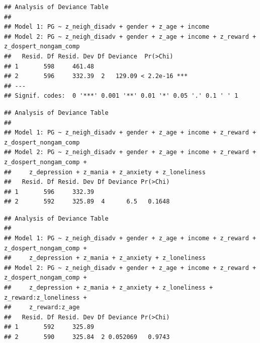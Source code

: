 \documentclass[
]{article}
\newenvironment{Shaded}{\begin{snugshade}}{\end{snugshade}}
\newcommand{\NormalTok}[1]{#1}
\newcommand{\SpecialCharTok}[1]{\textcolor[rgb]{0.81,0.36,0.00}{\textbf{#1}}}
\begin{document}
\begin{verbatim}
## Analysis of Deviance Table
## 
## Model 1: PG ~ z_neigh_disadv + gender + z_age + income
## Model 2: PG ~ z_neigh_disadv + gender + z_age + income + z_reward + z_dospert_nongam_comp
##   Resid. Df Resid. Dev Df Deviance  Pr(>Chi)    
## 1       598     461.48                          
## 2       596     332.39  2   129.09 < 2.2e-16 ***
## ---
## Signif. codes:  0 '***' 0.001 '**' 0.01 '*' 0.05 '.' 0.1 ' ' 1
\end{verbatim}

\begin{Shaded}
\end{Shaded}

\begin{verbatim}
## Analysis of Deviance Table
## 
## Model 1: PG ~ z_neigh_disadv + gender + z_age + income + z_reward + z_dospert_nongam_comp
## Model 2: PG ~ z_neigh_disadv + gender + z_age + income + z_reward + z_dospert_nongam_comp + 
##     z_depression + z_mania + z_anxiety + z_loneliness
##   Resid. Df Resid. Dev Df Deviance Pr(>Chi)
## 1       596     332.39                     
## 2       592     325.89  4      6.5   0.1648
\end{verbatim}

\begin{Shaded}
\end{Shaded}

\begin{verbatim}
## Analysis of Deviance Table
## 
## Model 1: PG ~ z_neigh_disadv + gender + z_age + income + z_reward + z_dospert_nongam_comp + 
##     z_depression + z_mania + z_anxiety + z_loneliness
## Model 2: PG ~ z_neigh_disadv + gender + z_age + income + z_reward + z_dospert_nongam_comp + 
##     z_depression + z_mania + z_anxiety + z_loneliness + z_reward:z_loneliness + 
##     z_reward:z_age
##   Resid. Df Resid. Dev Df Deviance Pr(>Chi)
## 1       592     325.89                     
## 2       590     325.84  2 0.052069   0.9743
\end{verbatim}

\begin{Shaded}
\end{Shaded}
\end{document}
